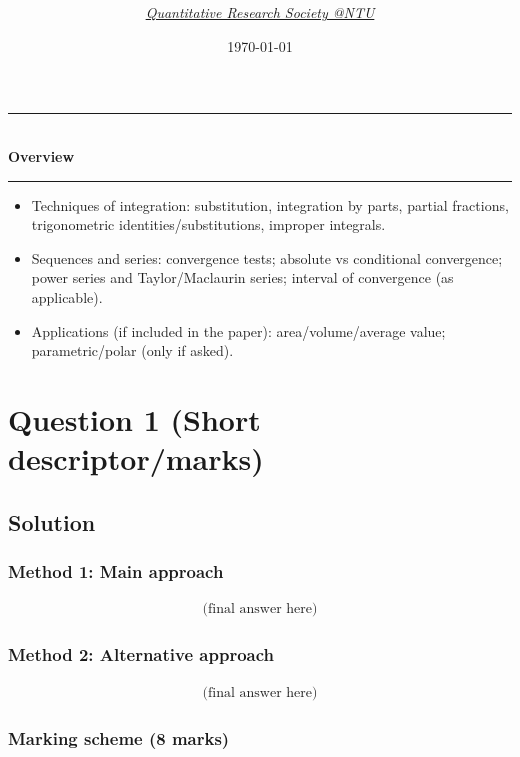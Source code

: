 \documentclass[12pt]{article}
\title{
\Huge \CourseCode\ \CourseName \\[0.3em]
\Large \DocType  \\[0.3em]
\large \ExamMeta
}
\author{
  \textit{\href{https://qrsntu.org}{Quantitative Research Society @NTU}}
}
\date{\today}
\newenvironment{overview}{
  \par\bigskip
  \begin{center}
    \rule{0.92\linewidth}{0.6pt}\\[-0.2em]
    \textbf{Overview}\\[-0.2em]
    \rule{0.92\linewidth}{0.6pt}
  \end{center}
  \vspace{-0.3em}
  \begin{itemize}[leftmargin=1.6em, itemsep=0.2em, topsep=0.2em]
}{
  \end{itemize}
  \par\bigskip
}
\begin{document}
\maketitle
\thispagestyle{plainfirst}
\pagestyle{main}

\begin{overview}
  \item Techniques of integration: substitution, integration by parts, partial fractions, trigonometric identities/substitutions, improper integrals.
  \item Sequences and series: convergence tests; absolute vs conditional convergence; power series and Taylor/Maclaurin series; interval of convergence (as applicable).
  \item Applications (if included in the paper): area/volume/average value; parametric/polar (only if asked).
\end{overview}

\newpage
\tableofcontents
\newpage
\section{Question 1 (Short descriptor/marks)}


\subsection{Solution}

\subsubsection{Method 1: Main approach}
\begin{align*}
  \boxed{\text{(final answer here)}}
\end{align*}


\subsubsection{Method 2: Alternative approach}
\begin{align*}
  \boxed{\text{(final answer here)}}
\end{align*}

\subsubsection{Marking scheme (8 marks)}
\end{document}
